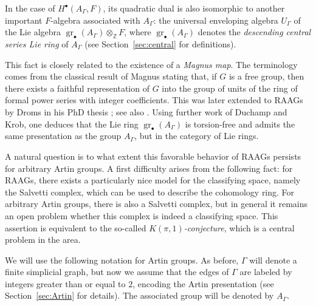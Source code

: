\documentclass[10pt, oneside]{amsart}
\newcommand{\gr}{\operatorname{gr}} %
\theoremstyle{definition}
\theoremstyle{remark}
\theoremstyle{plain}
\begin{document}
In the case of \(H^\bullet(A_\Gamma,F)\), its quadratic dual is also isomorphic to another important \(F\)-algebra associated with \(A_\Gamma\): the universal enveloping algebra \(U_\Gamma\) of the Lie algebra \(\gr_\bullet(A_\Gamma)\otimes_\mathbb{Z} F\), where \(\gr_\bullet(A_\Gamma)\) denotes the {\sl descending central series Lie ring} of \(A_\Gamma\) (see Section~\ref{sec:central} for definitions).

This fact is closely related to the existence of a {\sl Magnus map}. The terminology comes from the classical result of Magnus stating that, if \(G\) is a free group, then there exists a faithful representation of \(G\) into the group of units of the ring of formal power series with integer coefficients. This was later extended to RAAGs by Droms in his PhD thesis \cite{Droms}; see also \cite{Wade}. Using further work of Duchamp and Krob, one deduces that the Lie ring \(\gr_\bullet(A_\Gamma)\) is torsion-free and admits the same presentation as the group \(A_\Gamma\), but in the category of Lie rings.

A natural question is to what extent this favorable behavior of RAAGs persists for arbitrary Artin groups. A first difficulty arises from the following fact: for RAAGs, there exists a particularly nice model for the classifying space, namely the Salvetti complex, which can be used to describe the cohomology ring. For arbitrary Artin groups, there is also a Salvetti complex, but in general it remains an open problem whether this complex is indeed a classifying space. This assertion is equivalent to the so-called {\sl \(K(\pi,1)\)-conjecture}, which is a central problem in the area.

We will use the following notation for Artin groups. As before, \(\Gamma\) will denote a finite simplicial graph, but now we assume that the edges of \(\Gamma\) are labeled by integers greater than or equal to \(2\), encoding the Artin presentation (see Section~\ref{sec:Artin} for details). The associated group will be denoted by \(A_\Gamma\).
\end{document}
